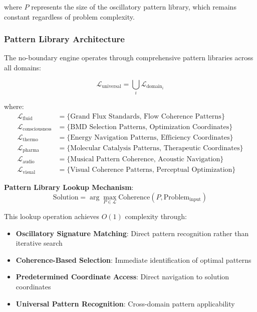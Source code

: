 \documentclass[11pt,a4paper]{article}
\theoremstyle{remark}
\begin{document}
where $P$ represents the size of the oscillatory pattern library, which remains constant regardless of problem complexity.

\subsubsection{Pattern Library Architecture}

The no-boundary engine operates through comprehensive pattern libraries across all domains:

\begin{equation}
\mathcal{L}_{\text{universal}} = \bigcup_{i} \mathcal{L}_{\text{domain}_i}
\end{equation}

where:
\begin{align}
\mathcal{L}_{\text{fluid}} &= \{\text{Grand Flux Standards, Flow Coherence Patterns}\} \\
\mathcal{L}_{\text{consciousness}} &= \{\text{BMD Selection Patterns, Optimization Coordinates}\} \\
\mathcal{L}_{\text{thermo}} &= \{\text{Energy Navigation Patterns, Efficiency Coordinates}\} \\
\mathcal{L}_{\text{pharma}} &= \{\text{Molecular Catalysis Patterns, Therapeutic Coordinates}\} \\
\mathcal{L}_{\text{audio}} &= \{\text{Musical Pattern Coherence, Acoustic Navigation}\} \\
\mathcal{L}_{\text{visual}} &= \{\text{Visual Coherence Patterns, Perceptual Optimization}\}
\end{align}

\textbf{Pattern Library Lookup Mechanism}:
\begin{equation}
\text{Solution} = \arg\max_{P \in \mathcal{L}} \text{Coherence}(P, \text{Problem}_{\text{input}})
\end{equation}

\textbf{} This lookup operation achieves $O(1)$ complexity through:\begin{itemize} \item \textbf{Oscillatory Signature Matching}: Direct pattern recognition rather than iterative search \item \textbf{Coherence-Based Selection}: Immediate identification of optimal patterns \item \textbf{Predetermined Coordinate Access}: Direct navigation to solution coordinates \item \textbf{Universal Pattern Recognition}: Cross-domain pattern applicability \end{itemize}
\end{document}
